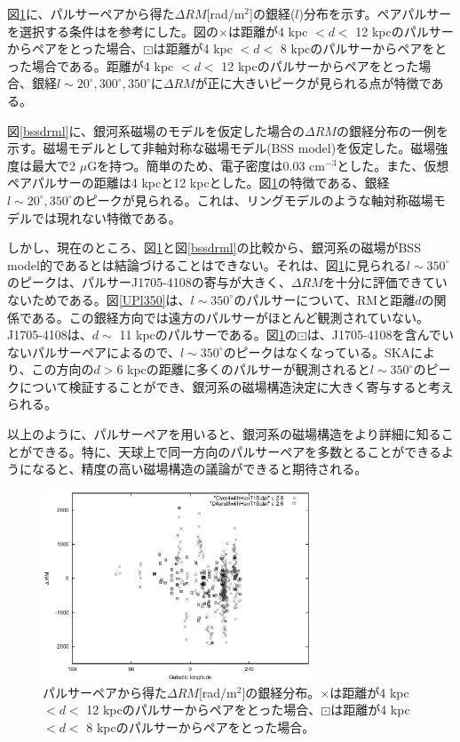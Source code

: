 図\ref{drmlo}に、パルサーペアから得た$\Delta RM$[rad/m$^2$]の銀経($l$)分布を示す。ペアパルサーを選択する条件は\cite{HAN2004}を参考にした。図の$\times$は距離が4 kpc $<d<$ 12 kpcのパルサーからペアをとった場合、$\boxdot$は距離が4 kpc $<d<$ 8 kpcのパルサーからペアをとった場合である。距離が4 kpc $<d<$ 12 kpcのパルサーからペアをとった場合、銀経$l \sim 20^{\circ}, 300^{\circ}, 350^{\circ}$に$\Delta RM$が正に大きいピークが見られる点が特徴である。

図\ref{bssdrml}に、銀河系磁場のモデルを仮定した場合の$\Delta RM$の銀経分布の一例を示す。磁場モデルとして非軸対称な磁場モデル(BSS model)を仮定した。磁場強度は最大で2 $\mu$Gを持つ。簡単のため、電子密度は0.03 cm$^{-3}$とした。また、仮想ペアパルサーの距離は4 kpcと12 kpcとした。図\ref{drmlo}の特徴である、銀経$l \sim 20^{\circ}, 350^{\circ}$のピークが見られる。これは、リングモデルのような軸対称磁場モデルでは現れない特徴である。

しかし、現在のところ、図\ref{drmlo}と図\ref{bssdrml}の比較から、銀河系の磁場がBSS model的であるとは結論づけることはできない。それは、図\ref{drmlo}に見られる$l \sim 350^{\circ}$のピークは、パルサーJ1705-4108の寄与が大きく、$\Delta RM$を十分に評価できていないためである。図\ref{UPl350}は、$l \sim 350^{\circ}$のパルサーについて、RMと距離$d$の関係である。この銀経方向では遠方のパルサーがほとんど観測されていない。J1705-4108は、$d \sim$ 11 kpcのパルサーである。図\ref{drmlo}の$\boxdot$は、J1705-4108を含んでいないパルサーペアによるので、$l \sim 350^{\circ}$のピークはなくなっている。SKAにより、この方向の$d > 6$ kpcの距離に多くのパルサーが観測されると$l \sim 350^{\circ}$のピークについて検証することができ、銀河系の磁場構造決定に大きく寄与すると考えられる。

以上のように、パルサーペアを用いると、銀河系の磁場構造をより詳細に知ることができる。特に、天球上で同一方向のパルサーペアを多数とることができるようになると、精度の高い磁場構造の議論ができると期待される。

\begin{figure}[htb]
\centering
\includegraphics[width=8cm,clip]{pulsar/drm-l.eps}
\caption{パルサーペアから得た$\Delta RM$[rad/m$^2$]の銀経分布。$\times$は距離が4 kpc $<d<$ 12 kpcのパルサーからペアをとった場合、$\boxdot$は距離が4 kpc $<d<$ 8 kpcのパルサーからペアをとった場合。}
\label{drmlo}
\end{figure}

